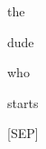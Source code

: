 \documentclass[varwidth=150mm]{standalone}
\begin{document}
\begin{CJK*}{UTF8}{gbsn}
{{{\colorbox{red!1.1995627880096436}{\strut the} \colorbox{red!0.0}{\strut dude} \colorbox{red!0.0}{\strut who} \colorbox{red!0.0}{\strut starts} \colorbox{red!2.017068386077881}{\strut [SEP]}
}}}
\end{CJK*}
\end{document}
